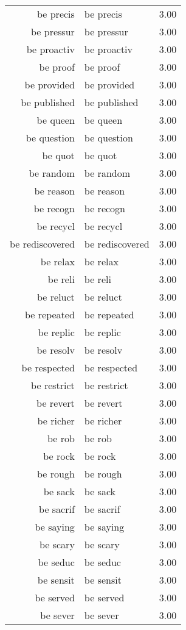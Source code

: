 \begin{table}[ht]
\begin{tabular}{rlr}
  be precis & be precis & 3.00 \\ 
  be pressur & be pressur & 3.00 \\ 
  be proactiv & be proactiv & 3.00 \\ 
  be proof & be proof & 3.00 \\ 
  be provided & be provided & 3.00 \\ 
  be published & be published & 3.00 \\ 
  be queen & be queen & 3.00 \\ 
  be question & be question & 3.00 \\ 
  be quot & be quot & 3.00 \\ 
  be random & be random & 3.00 \\ 
  be reason & be reason & 3.00 \\ 
  be recogn & be recogn & 3.00 \\ 
  be recycl & be recycl & 3.00 \\ 
  be rediscovered & be rediscovered & 3.00 \\ 
  be relax & be relax & 3.00 \\ 
  be reli & be reli & 3.00 \\ 
  be reluct & be reluct & 3.00 \\ 
  be repeated & be repeated & 3.00 \\ 
  be replic & be replic & 3.00 \\ 
  be resolv & be resolv & 3.00 \\ 
  be respected & be respected & 3.00 \\ 
  be restrict & be restrict & 3.00 \\ 
  be revert & be revert & 3.00 \\ 
  be richer & be richer & 3.00 \\ 
  be rob & be rob & 3.00 \\ 
  be rock & be rock & 3.00 \\ 
  be rough & be rough & 3.00 \\ 
  be sack & be sack & 3.00 \\ 
  be sacrif & be sacrif & 3.00 \\ 
  be saying & be saying & 3.00 \\ 
  be scary & be scary & 3.00 \\ 
  be seduc & be seduc & 3.00 \\ 
  be sensit & be sensit & 3.00 \\ 
  be served & be served & 3.00 \\ 
  be sever & be sever & 3.00 \\ 

\end{tabular}
\end{table}

